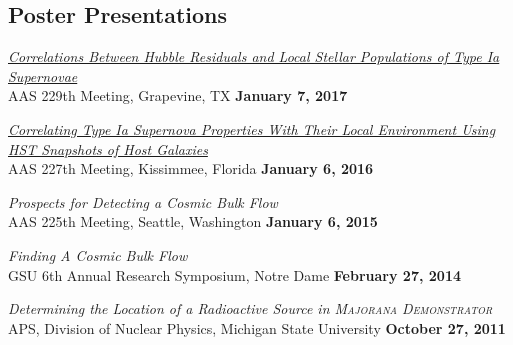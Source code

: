 \documentclass[margin]{res}
\begin{document}
\begin{resume}



\section{Poster Presentations}

\href{https://ui.adsabs.harvard.edu/#abs/2017AAS...22943402R/abstract}{{\sl Correlations Between Hubble Residuals and Local Stellar Populations of Type Ia \\Supernovae}} \\
AAS 229th Meeting, Grapevine, TX \hfill {\bf January 7, 2017}

\href{https://ui.adsabs.harvard.edu/#abs/2016AAS...22723711R/abstract}{{\sl Correlating Type Ia Supernova Properties With Their Local Environment Using HST Snapshots of Host Galaxies}} \\
AAS 227th Meeting, Kissimmee, Florida \hfill {\bf January 6, 2016}

{\sl Prospects for Detecting a Cosmic Bulk Flow}\\
AAS 225th Meeting, Seattle, Washington  \hfill {\bf January 6, 2015}

{\sl Finding A Cosmic Bulk Flow}\\
GSU 6th Annual Research Symposium, Notre Dame \hfill {\bf February 27, 2014}

{\sl Determining the Location of a Radioactive Source in \textsc{Majorana Demonstrator}} \\
APS, Division of Nuclear Physics, Michigan State University \hfill {\bf October 27, 2011}\\



\end{resume}
\end{document}
